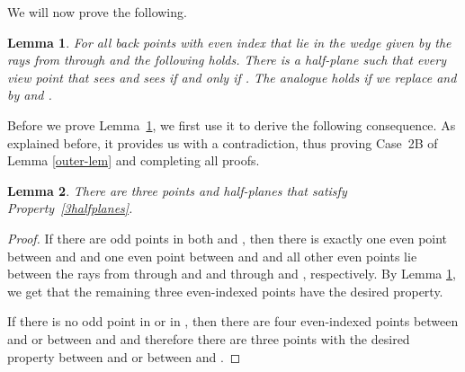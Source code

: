 \documentclass[11pt]{article}
\newtheorem{lemma}{Lemma}
\begin{document}
We will now prove the following.

\begin{lemma} \label{existenceHalfplanes-lem}
For all back points  with even index that lie in the wedge given by the rays from  through  and  the following holds.
There is a half-plane  such that every view point  that sees  and  sees  if and only if .
The analogue holds if we replace  and  by  and .
\end{lemma}
 
 Before we prove Lemma~\ref{existenceHalfplanes-lem}, we first use it to derive the following consequence. As explained before, it 
 provides us with a contradiction, thus proving Case~2B of Lemma \ref{outer-lem} and completing all proofs.
 
 \begin{lemma}
 There are three points  and half-planes  that satisfy Property~\ref{3halfplanes}.
 \end{lemma}
\begin{proof}
 If there are odd points in both  and , then there is exactly one even point between  and  and one even point 
 between  and  and all other even points lie between the rays from  through  and  and through  and , respectively. By Lemma \ref{existenceHalfplanes-lem}, we get that the remaining three even-indexed points have the desired property.
 
 If there is no odd point in  or in , then there are four even-indexed points between  and  or between  and  and therefore there are three points with the desired property between  and  or between  and .
 \end{proof}
 
\end{document}
